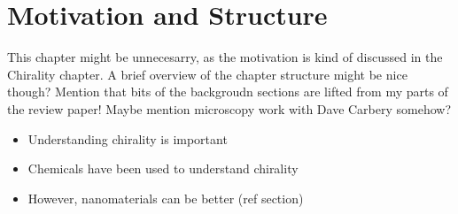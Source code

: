 \chapter{Motivation and Structure}\label{sec:background:Introduction}
\color{red}
This chapter might be unnecesarry, as the motivation is kind of discussed in the Chirality chapter. A brief overview of the chapter structure might be nice though?
Mention that bits of the backgroudn sections are lifted from my parts of the review paper! Maybe mention microscopy work with Dave Carbery somehow?
\color{black}

\begin{itemize}
    \item Understanding chirality is important
    \item Chemicals have been used to understand chirality
    \item However, nanomaterials can be better (ref section)
\end{itemize}